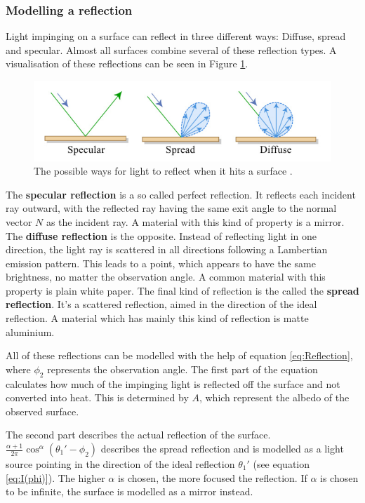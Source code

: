 \subsubsection{Modelling a reflection}
Light impinging on a surface can reflect in three different ways: Diffuse, spread and specular. Almost all surfaces combine several of these reflection types. A visualisation of these reflections can be seen in Figure \ref{fig:phong}.
\begin{figure}
	\includegraphics[width=\textwidth]{pics/3_reflections.png}
	\caption{The possible ways for light to reflect when it hits a surface \cite{3reflections}.\label{fig:phong}}
\end{figure}
The \textbf{specular reflection} is a so called perfect reflection. It reflects each incident ray outward, with the reflected ray having the same exit angle to the normal vector $N$ as the incident ray. A material with this kind of property is a mirror. The \textbf{diffuse reflection} is the opposite. Instead of reflecting light in one direction, the light ray is scattered in all directions following a Lambertian emission pattern. This leads to a point, which appears to have the same brightness, no matter the observation angle. A common material with this property is plain white paper. The final kind of reflection is the called the \textbf{spread reflection}. It's a scattered reflection, aimed in the direction of the ideal reflection. A material which has mainly this kind of reflection is matte aluminium.

All of these reflections can be modelled with the help of equation \ref{eq:Reflection}, where $\phi_2$ represents the observation angle. The first part of the equation calculates how much of the impinging light is reflected off the surface and not converted into heat. This is determined by $A$, which represent the albedo of the observed surface. 

The second part describes the actual reflection of the surface. $\frac{\alpha+1}{2\pi}\cos^\alpha(\theta_1'-\phi_2)$ describes the spread reflection and is modelled as a  light source pointing in the direction of the ideal reflection $\theta_1'$ (see equation \ref{eq:I(phi)}). The higher $\alpha$ is chosen, the more focused the reflection. If $\alpha$ is chosen to be infinite, the surface is modelled as a mirror instead.


